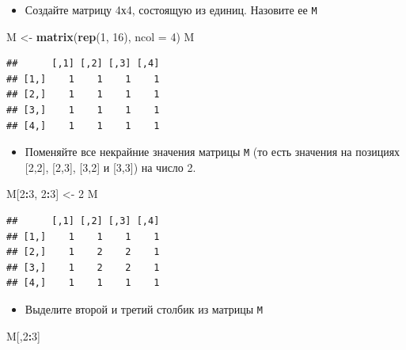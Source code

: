 \documentclass[]{book}
\newenvironment{Shaded}{\begin{snugshade}}{\end{snugshade}}
\newcommand{\DataTypeTok}[1]{\textcolor[rgb]{0.13,0.29,0.53}{#1}}
\newcommand{\DecValTok}[1]{\textcolor[rgb]{0.00,0.00,0.81}{#1}}
\newcommand{\KeywordTok}[1]{\textcolor[rgb]{0.13,0.29,0.53}{\textbf{#1}}}
\newcommand{\NormalTok}[1]{#1}
\newcommand{\OperatorTok}[1]{\textcolor[rgb]{0.81,0.36,0.00}{\textbf{#1}}}
\newcommand{\StringTok}[1]{\textcolor[rgb]{0.31,0.60,0.02}{#1}}
\providecommand{\tightlist}{%
  \setlength{\itemsep}{0pt}\setlength{\parskip}{0pt}}
\begin{document}
\begin{itemize}
\tightlist
\item
  Создайте матрицу 4х4, состоящую из единиц. Назовите ее \texttt{M}
\end{itemize}

\begin{Shaded}
\begin{Highlighting}[]
\NormalTok{M <-}\StringTok{ }\KeywordTok{matrix}\NormalTok{(}\KeywordTok{rep}\NormalTok{(}\DecValTok{1}\NormalTok{, }\DecValTok{16}\NormalTok{), }\DataTypeTok{ncol =} \DecValTok{4}\NormalTok{)}
\NormalTok{M}
\end{Highlighting}
\end{Shaded}

\begin{verbatim}
##      [,1] [,2] [,3] [,4]
## [1,]    1    1    1    1
## [2,]    1    1    1    1
## [3,]    1    1    1    1
## [4,]    1    1    1    1
\end{verbatim}

\begin{itemize}
\tightlist
\item
  Поменяйте все некрайние значения матрицы \texttt{M} (то есть значения на позициях {[}2,2{]}, {[}2,3{]}, {[}3,2{]} и {[}3,3{]}) на число 2.
\end{itemize}

\begin{Shaded}
\begin{Highlighting}[]
\NormalTok{M[}\DecValTok{2}\OperatorTok{:}\DecValTok{3}\NormalTok{, }\DecValTok{2}\OperatorTok{:}\DecValTok{3}\NormalTok{] <-}\StringTok{ }\DecValTok{2}
\NormalTok{M}
\end{Highlighting}
\end{Shaded}

\begin{verbatim}
##      [,1] [,2] [,3] [,4]
## [1,]    1    1    1    1
## [2,]    1    2    2    1
## [3,]    1    2    2    1
## [4,]    1    1    1    1
\end{verbatim}

\begin{itemize}
\tightlist
\item
  Выделите второй и третий столбик из матрицы \texttt{M}
\end{itemize}

\begin{Shaded}
\begin{Highlighting}[]
\NormalTok{M[,}\DecValTok{2}\OperatorTok{:}\DecValTok{3}\NormalTok{]}
\end{Highlighting}
\end{Shaded}
\end{document}
